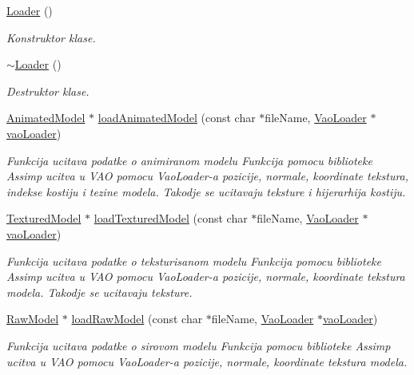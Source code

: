 \begin{DoxyCompactItemize}
\item 
\hyperlink{classcore_1_1Loader_a8fc16cee7fd1812e40b1e78aa2568535}{Loader} ()
\begin{DoxyCompactList}\small\item\em Konstruktor klase. \end{DoxyCompactList}\item 
\hyperlink{classcore_1_1Loader_a16110f8585d6f746307d1d145a1d6f04}{$\sim$\+Loader} ()
\begin{DoxyCompactList}\small\item\em Destruktor klase. \end{DoxyCompactList}\item 
\hyperlink{classmodel_1_1AnimatedModel}{Animated\+Model} $\ast$ \hyperlink{classcore_1_1Loader_a468d5cec790c008637111fb0b0bd7d6d}{load\+Animated\+Model} (const char $\ast$file\+Name, \hyperlink{classcore_1_1VaoLoader}{Vao\+Loader} $\ast$\hyperlink{namespacecore_a78dd24784c415d3759a0f71b8f4f9f81}{vao\+Loader})
\begin{DoxyCompactList}\small\item\em Funkcija ucitava podatke o animiranom modelu Funkcija pomocu biblioteke Assimp ucitva u V\+AO pomocu Vao\+Loader-\/a pozicije, normale, koordinate tekstura, indekse kostiju i tezine modela. Takodje se ucitavaju teksture i hijerarhija kostiju. \end{DoxyCompactList}\item 
\hyperlink{classmodel_1_1TexturedModel}{Textured\+Model} $\ast$ \hyperlink{classcore_1_1Loader_a0738ff43667e227e672b4d12f12afb46}{load\+Textured\+Model} (const char $\ast$file\+Name, \hyperlink{classcore_1_1VaoLoader}{Vao\+Loader} $\ast$\hyperlink{namespacecore_a78dd24784c415d3759a0f71b8f4f9f81}{vao\+Loader})
\begin{DoxyCompactList}\small\item\em Funkcija ucitava podatke o teksturisanom modelu Funkcija pomocu biblioteke Assimp ucitva u V\+AO pomocu Vao\+Loader-\/a pozicije, normale, koordinate tekstura modela. Takodje se ucitavaju teksture. \end{DoxyCompactList}\item 
\hyperlink{classmodel_1_1RawModel}{Raw\+Model} $\ast$ \hyperlink{classcore_1_1Loader_afff340dee890eb62e24d958b1d1a609c}{load\+Raw\+Model} (const char $\ast$file\+Name, \hyperlink{classcore_1_1VaoLoader}{Vao\+Loader} $\ast$\hyperlink{namespacecore_a78dd24784c415d3759a0f71b8f4f9f81}{vao\+Loader})
\begin{DoxyCompactList}\small\item\em Funkcija ucitava podatke o sirovom modelu Funkcija pomocu biblioteke Assimp ucitva u V\+AO pomocu Vao\+Loader-\/a pozicije, normale, koordinate tekstura modela. \end{DoxyCompactList}\end{DoxyCompactItemize}
